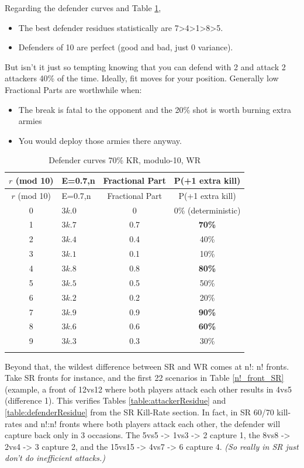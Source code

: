 Regarding the defender curves and Table \ref{table:defenderResidue_WR}, 
\begin{itemize}
    \item The best defender residues statistically are 7>4>1>8>5. 
    \item Defenders of 10 are perfect (good and bad, just 0 variance).
\end{itemize}
But isn't it just so tempting knowing that you can defend with 2 and attack 2 attackers 40\% of the time. Ideally, fit moves for your position. Generally low Fractional Parts are worthwhile when:
\begin{itemize}
    \item The break is fatal to the opponent and the 20\% shot is worth burning extra armies
    \item You would deploy those armies there anyway.
\end{itemize}


\small
\begin{longtable}{|c|l|c|c|}
\hline
\rowcolor{Baby_Blue}
$r$ (mod 10) & E=0.7,n & Fractional Part & P(+1 extra kill) \\ 
\hline\hline
\endfirsthead
\hline
\rowcolor{Baby_Blue}
$r$ (mod 10) & E=0.7,n & Fractional Part & P(+1 extra kill) \\ 
\hline\hline
\endhead
0 & $3k.0$ & 0 & 0\% (deterministic) \\ 
1 & $3k.7$ & 0.7 & \textbf{70\%} \\
2 & $3k.4$ & 0.4 & 40\% \\
3 & $3k.1$ & 0.1 & 10\% \\
4 & $3k.8$ & 0.8 & \textbf{80\%}  \\
5 & $3k.5$ & 0.5 & 50\%  \\
6 & $3k.2$ & 0.2 & 20\%  \\
7 & $3k.9$ & 0.9 & \textbf{90\%}  \\
8 & $3k.6$ & 0.6 & \textbf{60\%}  \\
9 & $3k.3$ & 0.3 & 30\%  \\
\hline
\caption{Defender curves 70\% KR, modulo-10, WR}
\label{table:defenderResidue_WR}
\end{longtable}
\normalsize

Beyond that, the wildest difference between SR and WR comes at n!: n! fronts. Take SR fronts for instance, and the first 22 scenarios in Table \ref{n!_front_SR} (example, a front of 12vs12 where both players attack each other results in 4vs5 (difference 1). This verifies Tables \ref{table:attackerResidue} and \ref{table:defenderResidue} from the SR Kill-Rate section. In fact, in SR 60/70 kill-rates and n!:n! fronts where both players attack each other, the defender will capture back only in 3 occasions. The 5vs5 -> 1vs3 -> 2 capture 1, the 8vs8 -> 2vs4 -> 3 capture 2, and the 15vs15 -> 4vs7 -> 6 capture 4. \textit{(So really in SR just don't do inefficient attacks.)}

